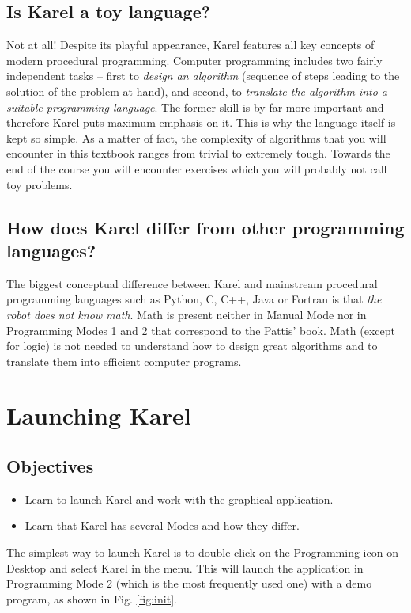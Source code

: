 \subsection{Is Karel a toy language?}

Not at all! Despite its playful appearance, Karel features all key
concepts of modern procedural programming. Computer programming includes two 
fairly independent tasks -- first to {\em design an algorithm} (sequence of 
steps leading to the solution of the problem at hand), and second, to {\em translate 
the algorithm into a suitable programming language}. The former skill is by 
far more important and therefore Karel puts maximum emphasis on it. This is 
why the language itself is kept so simple. As a matter of fact, the complexity 
of algorithms that you will encounter in this textbook ranges from trivial  
to extremely tough. Towards the end of the course you will encounter exercises
which you will probably not call toy problems.

\subsection{How does Karel differ from other programming languages?}

The biggest conceptual difference between Karel and mainstream procedural
programming languages such as Python, C, C++, Java or Fortran is that {\em 
the robot does not know math}. Math is present neither in Manual Mode nor 
in Programming Modes 1 and 2 that correspond to the Pattis' book. 
Math (except for logic) is not needed to understand how to design great 
algorithms and to translate them into efficient computer programs. 
 
\section{Launching Karel}

\subsection{Objectives} 
\begin{itemize}
\item Learn to launch Karel and work with the graphical application.
\item Learn that Karel has several Modes and how they differ.
\end{itemize}
\noindent
The simplest way to launch Karel is to double click on the Programming icon on Desktop 
and select Karel in the menu. This will launch the application in Programming 
Mode 2 (which is the most frequently used one) with a demo program, as shown in Fig. 
\ref{fig:init}.

